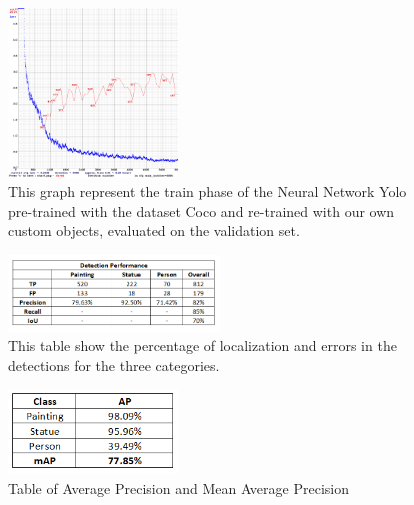 \begin{figure}
    \centering
        \includegraphics[width=0.4\textwidth]{pictures/painting_detection/chartv4.png}
    \caption{This graph represent the train phase of the Neural Network Yolo pre-trained with the dataset Coco and re-trained with our own custom objects, evaluated on the validation set.}
    \label{fig:figura1}
\end{figure}



\begin{figure}
    \centering
        \includegraphics[width=0.5\textwidth]{pictures/painting_detection/tabella3.png}
    \caption{This table show the percentage of localization and  errors in the detections for the three categories.}
    \label{fig:figura2}
\end{figure}

\begin{figure}[h]
    \centering
        \includegraphics[width=0.4\textwidth]{pictures/painting_detection/tabella2.png}
    \caption{Table of Average Precision and Mean Average Precision}
    \label{fig:figura3}
\end{figure} 

